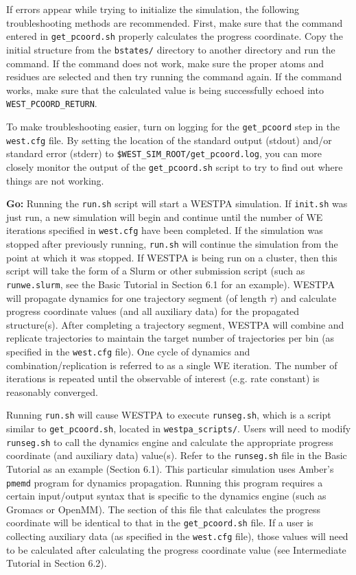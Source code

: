 \documentclass[9pt,tutorial,pubversion]{livecoms}
\begin{document}
If errors appear while trying to initialize the simulation, the following troubleshooting methods are recommended. 
First, make sure that the command entered in \verb|get_pcoord.sh| properly calculates the progress coordinate. 
Copy the initial structure from the \verb|bstates/| directory to another directory and run the command. 
If the command does not work, make sure the proper atoms and residues are selected and then try running the command again. 
If the command works, make sure that the calculated value is being successfully echoed into \verb|WEST_PCOORD_RETURN|.

To make troubleshooting easier, turn on logging for the \verb|get_pcoord| step in the \verb|west.cfg| file. 
By setting the location of the standard output (stdout) and/or standard error (stderr) to \verb|$WEST_SIM_ROOT/get_pcoord.log|, you can more closely monitor the output of the \verb|get_pcoord.sh| script to try to find out where things are not working.

\textbf{Go:} Running the \verb|run.sh| script will start a WESTPA simulation. 
If \verb|init.sh| was just run, a new simulation will begin and continue until the number of WE iterations specified in \verb|west.cfg| have been completed. 
If the simulation was stopped after previously running, \verb|run.sh| will continue the simulation from the point at which it was stopped. 
If WESTPA is being run on a cluster, then this script will take the form of a Slurm or other submission script (such as \verb|runwe.slurm|, see the Basic Tutorial in Section 6.1 for an example). 
WESTPA will propagate dynamics for one trajectory segment (of length $\tau$) and calculate progress coordinate values (and all auxiliary data) for the propagated structure(s). 
After completing a trajectory segment, WESTPA will combine and replicate trajectories to maintain the target number of trajectories per bin (as specified in the \verb|west.cfg| file). 
One cycle of dynamics and combination/replication is referred to as a single WE iteration. 
The number of iterations is repeated until the observable of interest (e.g. rate constant) is reasonably converged.

Running \verb|run.sh| will cause WESTPA to execute \verb|runseg.sh|, which is a script similar to \verb|get_pcoord.sh|, located in \verb|westpa_scripts/|. 
Users will need to modify \verb|runseg.sh| to call the dynamics engine and calculate the appropriate progress coordinate (and auxiliary data) value(s). 
Refer to the \verb|runseg.sh| file in the Basic Tutorial as an example (Section 6.1). 
This particular simulation uses Amber’s \verb|pmemd| program for dynamics propagation. 
Running this program requires a certain input/output syntax that is specific to the dynamics engine (such as Gromacs or OpenMM). 
The section of this file that calculates the progress coordinate will be identical to that in the \verb|get_pcoord.sh| file. If a user is collecting auxiliary data (as specified in the \verb|west.cfg| file), those values will need to be calculated after calculating the progress coordinate value (see Intermediate Tutorial in Section 6.2).
\end{document}
